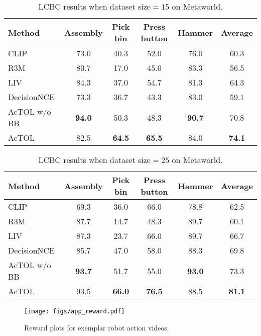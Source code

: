 \begin{table*}[t]
    \centering
    \caption{LCBC results when dataset size$=15$ on Metaworld.}
    \label{tab:metaworld_15}
    \begin{tabular}{lccccc}
        \toprule
        Method & Assembly & Pick bin & Press button & Hammer & Average \\
        \hline
        CLIP & 73.0 & 40.3 & 52.0 & 76.0 & 60.3 \\
        R3M & 80.7 & 17.0 & 45.0 & 83.3 & 56.5 \\
        LIV & 84.3 & 37.0 & 54.7 & 81.3 & 64.3 \\
        DecisionNCE & 73.3 & 36.7 & 43.3 & 83.0 & 59.1 \\
        AcTOL w/o BB & \cellcolor{lightgray}\textbf{94.0} & 50.3 & 48.3 & \cellcolor{lightgray}\textbf{90.7} & 70.8 \\
        AcTOL & 82.5 & \cellcolor{lightgray}\textbf{64.5} & \cellcolor{lightgray}\textbf{65.5} & 84.0 & \cellcolor{lightgray}\textbf{74.1} \\
        \bottomrule
    \end{tabular}
\end{table*}

\begin{table*}[t]
    \centering
    \caption{LCBC results when dataset size$=25$ on Metaworld.}
    \label{tab:metaworld_25}
    \begin{tabular}{lccccc}
        \toprule
        Method & Assembly & Pick bin & Press button & Hammer & Average \\
        \hline
        CLIP & 69.3 & 36.0 & 66.0 & 78.8 & 62.5 \\
        R3M & 87.7 & 14.7 & 48.3 & 89.7 & 60.1 \\
        LIV & 87.3 & 23.7 & 66.0 & 89.7 & 66.7 \\
        DecisionNCE & 85.7 & 47.0 & 58.0 & 88.3 & 69.8 \\
        AcTOL w/o BB & \cellcolor{lightgray}\textbf{93.7} & 51.7 & 55.0 & \cellcolor{lightgray}\textbf{93.0} & 73.3 \\
        AcTOL & 93.5 & \cellcolor{lightgray}\textbf{66.0} & \cellcolor{lightgray}\textbf{76.5} & 88.5 & \cellcolor{lightgray}\textbf{81.1} \\
        \bottomrule
    \end{tabular}
\end{table*}


\begin{figure}[t]
\begin{center}

\centerline{\texttt{[image: figs/app\_reward.pdf]}}

\caption{Reward plots for exemplar robot action videos.}
\label{fig:app_reward}
\end{center}
\end{figure}

